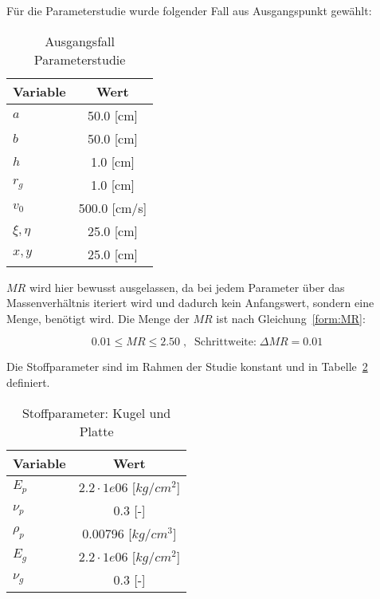 Für die Parameterstudie wurde folgender Fall aus Ausgangspunkt gewählt: 

\begin{table}[H]
	\begin{center}
		\caption{Ausgangsfall Parameterstudie}
		\label{tab:Ausgang}
		\begin{tabular}{l|c}
			\textbf{Variable} & \textbf{Wert}\\
			\hline
			$a$ & 50.0 [cm]\\
			$b$ & 50.0 [cm]\\
			$h$ & 1.0 [cm]\\
			$r_{g}$ & 1.0 [cm]\\
			$v_{0}$ & 500.0 [cm/s]\\
			$\xi,\eta$ & 25.0 [cm]\\
			$x,y$ & 25.0 [cm]\\ 		
		\end{tabular}
	\end{center}
\end{table}

$MR$ wird hier bewusst ausgelassen, da bei jedem Parameter über das Massenverhältnis iteriert wird und dadurch kein Anfangswert, sondern eine Menge, benötigt wird. Die Menge der $MR$ ist nach Gleichung~\ref{form:MR}:

\begin{equation}
	\label{form:MR}
	0.01 \leq MR \leq 2.50 \; , \;\; \mbox{Schrittweite:} \; \Delta MR = 0.01
\end{equation}

Die Stoffparameter sind im Rahmen der Studie konstant und in Tabelle~\ref{tab:Stoff} definiert.

\begin{table}[H]
	\begin{center}
		\caption{Stoffparameter: Kugel und Platte}
		\label{tab:Stoff}
		\begin{tabular}{l|c}
			\textbf{Variable} & \textbf{Wert}\\
			\hline
			$E_{p}$ & $2.2 \cdot 1e06$ [$kg/cm^2$]\\
			$\nu_{p}$ & 0.3 [-]\\
			$\rho_{p}$ & 0.00796 [$kg/cm^{3}$]\\
			\hline
			$E_{g}$ &  $2.2 \cdot 1e06$ [$kg/cm^2$]\\
			$\nu_{g}$ & 0.3 [-]\\		
		\end{tabular}
	\end{center}
\end{table}

